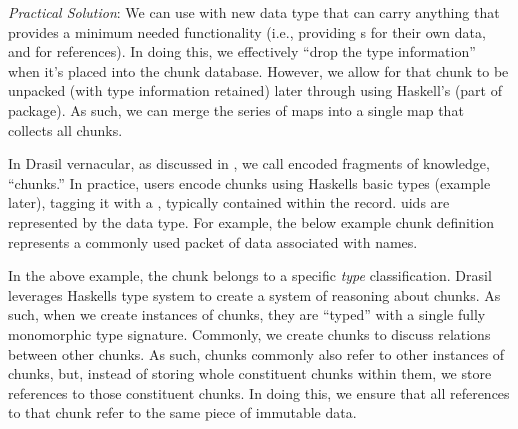 \begin{writingdirectives}
      \item \textit{Practical Solution}: We can use \ExistentialQuantification{}
            with new data type that can carry anything that provides a minimum
            needed functionality (i.e., providing \UID{}s for their own data,
            and for references). In doing this, we effectively ``drop the type
            information'' when it's placed into the chunk database. However, we
            allow for that chunk to be unpacked (with type information retained)
            later through using Haskell's  (part of
             package). As such, we can merge the series of maps
            into a single map that collects all chunks.

\end{writingdirectives}

In Drasil vernacular, as discussed in , we call encoded
fragments of knowledge, ``chunks.'' In practice, users encode chunks using
Haskells basic  types (example later), tagging it with a
, typically contained within the record. \acsp{uid} are represented by
the \UID{} data type. For example,  the below example chunk definition represents a
commonly used packet of data associated with names.


In the above example, the chunk belongs to a specific \textit{type}
classification. Drasil
leverages Haskells type system to create a system of reasoning about chunks. As
such, when we create instances of chunks, they are ``typed'' with a single fully
monomorphic type signature. Commonly, we create chunks to discuss relations
between other chunks. As such, chunks commonly also refer to other instances of
chunks, but, instead of storing whole constituent chunks within them, we store
\UID{} references to those constituent chunks. In doing this, we ensure that all
references to that chunk refer to the same piece of immutable data.


